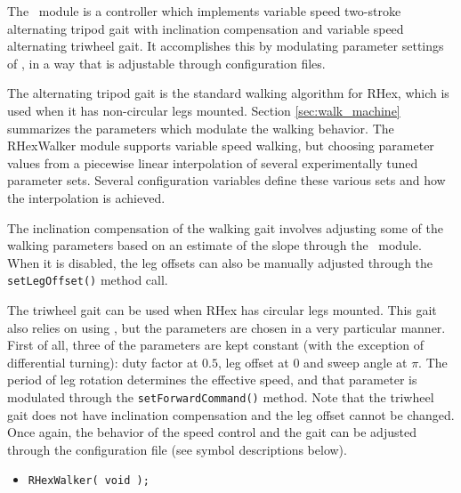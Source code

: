 The \RHexWalker\ module is a controller which implements variable speed
two-stroke alternating tripod gait with inclination compensation and
variable speed alternating triwheel gait. It accomplishes this by modulating
parameter settings of \WalkMachine, in a way that is adjustable through
configuration files.

The alternating tripod gait is the standard walking algorithm for RHex,
which is used when it has non-circular legs mounted. Section
\ref{sec:walk_machine} summarizes the parameters which modulate the walking
behavior. The RHexWalker module supports variable speed walking, but
choosing parameter values from a piecewise linear interpolation of several
experimentally tuned parameter sets. Several configuration variables define
these various sets and how the interpolation is achieved.

The inclination compensation of the walking gait involves adjusting some of
the walking parameters based on an estimate of the slope through the
\SlopeEstimator\ module. When it is disabled, the leg offsets can also be
manually adjusted through the {\tt setLegOffset()} method call.

The triwheel gait can be used when RHex has circular legs mounted. This gait
also relies on using \WalkMachine, but the parameters are chosen in a very
particular manner. First of all, three of the parameters are kept constant
(with the exception of differential turning): duty factor at $0.5$, leg
offset at $0$ and sweep angle at $\pi$. The period of leg rotation
determines the effective speed, and that parameter is modulated through the
{\tt setForwardCommand()} method. Note that the triwheel gait does not have
inclination compensation and the leg offset cannot be changed. Once again,
the behavior of the speed control and the gait can be adjusted through the
configuration file (see symbol descriptions below).\\

\constructors

\begin{itemize}
\item{\tt RHexWalker( void ); }
\end{itemize}

\localinterface

